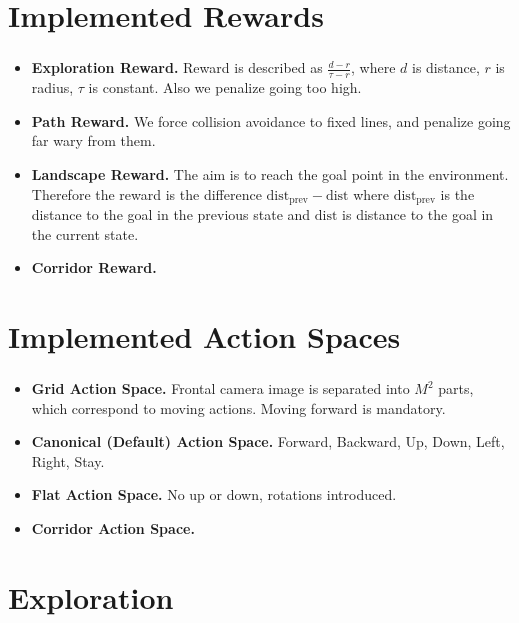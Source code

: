 \documentclass[t]{beamer}
\begin{document}
\section{Implemented Rewards}

\begin{frame}
	\frametitle{\insertsection}
	\begin{itemize}
    \item {\bf Exploration Reward.} Reward is described as $\frac{d - r}{\tau - r}$, where $d$ is distance, $r$ is radius, $\tau$ is constant.
        Also we penalize going too high.
    \item {\bf Path Reward.} We force collision avoidance to fixed lines, and penalize going far wary from them.
    \item {\bf Landscape Reward.} The aim is to reach the goal point in the environment. Therefore the reward is the difference $\text{dist}_{\text{prev}} - \text{dist}$ where $\text{dist}_{\text{prev}}$ is the distance to the goal in the previous state and $\text{dist}$ is distance to the goal in the current state.
    \item {\bf Corridor Reward.}
\end{itemize}
\end{frame}

\section{Implemented Action Spaces}

\begin{frame}
	\frametitle{\insertsection}
	\begin{itemize}
	    \item {\bf Grid Action Space.} Frontal camera image is separated into $M^2$ parts, which correspond to moving actions. Moving forward is
	        mandatory.
	    \item {\bf Canonical (Default) Action Space.} Forward, Backward, Up, Down, Left, Right, Stay.
	    \item {\bf Flat Action Space.} No up or down, rotations introduced.
	    \item {\bf Corridor Action Space.}
	\end{itemize}
\end{frame}

\section{Exploration}
\end{document}
